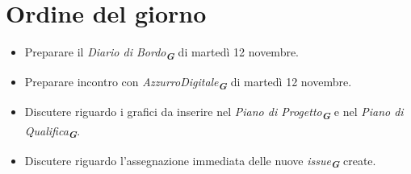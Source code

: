 

\section{Ordine del giorno}

\begin{itemize}
    \item Preparare il \emph{Diario di Bordo}\textsubscript{\textit{\textbf{G}}} di martedì 12 novembre.
    \item Preparare incontro con \emph{AzzurroDigitale}\textsubscript{\textit{\textbf{G}}} di martedì 12 novembre.
    \item Discutere riguardo i grafici da inserire nel \emph{Piano di Progetto}\textsubscript{\textit{\textbf{G}}} e nel \emph{Piano di Qualifica}\textsubscript{\textit{\textbf{G}}}.
    \item Discutere riguardo l'assegnazione immediata delle nuove \emph{issue}\textsubscript{\textit{\textbf{G}}} create.
\end{itemize}